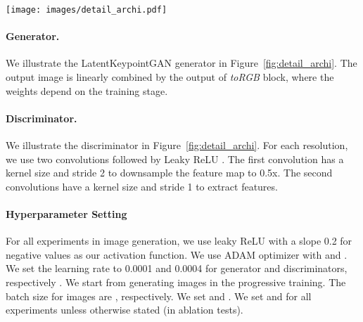 \documentclass[10pt, conference, compsocconf]{IEEEtran}
\begin{document}
\begin{figure*}[t]
\begin{center}
   \texttt{[image: images/detail\_archi.pdf]}
\end{center}
   \caption{\textbf{Detailed architecture.} (Left) \textbf{LatentKeypointGAN generator.} The numbers in the parenthesis is the output dimension of the Keypoint-based ConvBlock. For example, (512, 4, 4) means the output feature map has a resolution of  and the channel size is 512. The toRGB blocks are  convolutions to generate the RGB images with the same resolution as corresponding feature maps. (Middle) \textbf{LatentKeypointGAN discriminator.} The number in the last parenthesis is the output dimension. For example, (512, 4, 4) means the output feature map has a resolution of  and the channel size is 512. At each resolution, we apply two convolutions, one with stride 2 to downsample feature maps and one with stride 1 to extract features. Leaky ReLU \cite{maas2013rectifier} is used after all convolutions except the linear layer in the last.. (Right) \textbf{Progressive Training.}. The adapting period is the same as PGGAN \cite{karras2018progressive} and StyleGAN \cite{karras2019style}. In the non-adapting period, we do not use the linear combination.}
\label{fig:detail_archi}
\end{figure*}

\paragraph{Generator.} We illustrate the LatentKeypointGAN generator in Figure~\ref{fig:detail_archi}. The output image is linearly combined by the output of \textit{toRGB} block, where the weights depend on the training stage.

\paragraph{Discriminator.}
We illustrate the discriminator in Figure~\ref{fig:detail_archi}. For each resolution, we use two convolutions followed by Leaky ReLU \cite{maas2013rectifier}. The first convolution has a kernel size  and stride 2 to downsample the feature map to 0.5x. The second convolutions have a kernel size  and stride 1 to extract features.

\paragraph{Hyperparameter Setting}
For all experiments in image generation, we use leaky ReLU \cite{maas2013rectifier} with a slope 0.2 for negative values as our activation function. We use ADAM optimizer \cite{KingmaB14} with  and . We set the learning rate to 0.0001 and 0.0004 for generator and discriminators, respectively \cite{heusel2017gans}. We start from generating  images in the progressive training. The batch size for  images are , respectively. We set  and . We set  and  for all experiments unless otherwise stated (in ablation tests).
\end{document}
